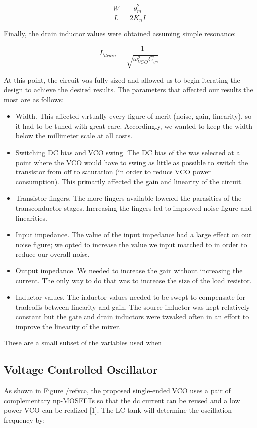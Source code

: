 \begin{equation}
\frac{W}{L} = \frac{g_{m}^2}{2K_{n}I}
\end{equation}

Finally, the drain inductor values were obtained assuming simple resonance:

\begin{equation}
L_{drain} = \frac{1}{\sqrt{\omega^{2}_{VCO}C_{gs}}}
\end{equation}

At this point, the circuit was fully sized and allowed us to begin iterating the design to achieve the desired results.
The parameters that affected our results the most are as follows:

\begin{itemize}
\item Width. This affected virtually every figure of merit (noise, gain, linearity), so it had to be tuned with great care. Accordingly, we wanted to keep the width below the millimeter scale at all costs.
\item Switching DC bias and VCO swing. The DC bias of the was selected at a point where the VCO would have to swing as little as possible to switch the transistor from off to saturation (in order to reduce VCO power consumption). This primarily affected the gain and linearity of the circuit.
\item Transistor fingers. The more fingers available lowered the parasitics of the transconductor stages. Increasing the fingers led to improved noise figure and linearities.
\item Input impedance. The value of the input impedance had a large effect on our noise figure; we opted to increase the value we input matched to in order to reduce our overall noise.
\item Output impedance. We needed to increase the gain without increasing the current. The only way to do that was to increase the size of the load resistor.
\item Inductor values. The inductor values needed to be swept to compensate for tradeoffs between linearity and gain. The source inductor was kept relatively constant but the gate and drain inductors were tweaked often in an effort to improve the linearity of the mixer.
\end{itemize}

These are a small subset of the variables used when 

\subsection{Voltage Controlled Oscillator}
As shown in Figure /ref{vco}, the proposed single-ended VCO uses a pair of complementary np-MOSFETs so that the dc current can be reused and a low power VCO can be realized [1]. The LC tank will determine the oscillation frequency by:

